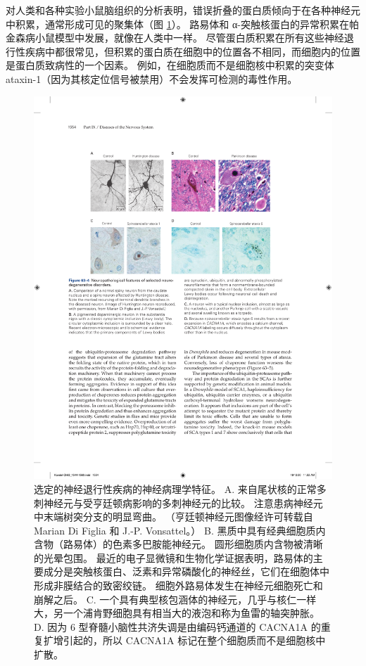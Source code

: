 对人类和各种实验小鼠脑组织的分析表明，错误折叠的蛋白质倾向于在各种神经元中积累，通常形成可见的聚集体（图 \ref{fig:63_4}）。
路易体和 α-突触核蛋白的异常积累在帕金森病小鼠模型中发展，就像在人类中一样。
尽管蛋白质积累在所有这些神经退行性疾病中都很常见，但积累的蛋白质在细胞中的位置各不相同，而细胞内的位置是蛋白质致病性的一个因素。
例如，在细胞质而不是细胞核中积累的突变体 ataxin-1（因为其核定位信号被禁用）不会发挥可检测的毒性作用。


\begin{figure}[htbp]
	\centering
	\includegraphics[width=0.8\linewidth]{chap63/fig_63_4}
	\caption{选定的神经退行性疾病的神经病理学特征。 A. 来自尾状核的正常多刺神经元与受亨廷顿病影响的多刺神经元的比较。 注意患病神经元中末端树突分支的明显弯曲。 （亨廷顿神经元图像经许可转载自 Marian Di Figlia 和 J.-P. Vonsattel。） B. 黑质中具有经典细胞质内含物（路易体）的色素多巴胺能神经元。 圆形细胞质内含物被清晰的光晕包围。 最近的电子显微镜和生物化学证据表明，路易体的主要成分是突触核蛋白、泛素和异常磷酸化的神经丝，它们在细胞体中形成非膜结合的致密绞链。 细胞外路易体发生在神经元细胞死亡和崩解之后。 C. 一个具有典型核包涵体的神经元，几乎与核仁一样大，另一个浦肯野细胞具有相当大的液泡和称为鱼雷的轴突肿胀。 D. 因为 6 型脊髓小脑性共济失调是由编码钙通道的 CACNA1A 的重复扩增引起的，所以 CACNA1A 标记在整个细胞质而不是细胞核中扩散。}
	\label{fig:63_4}
\end{figure}


